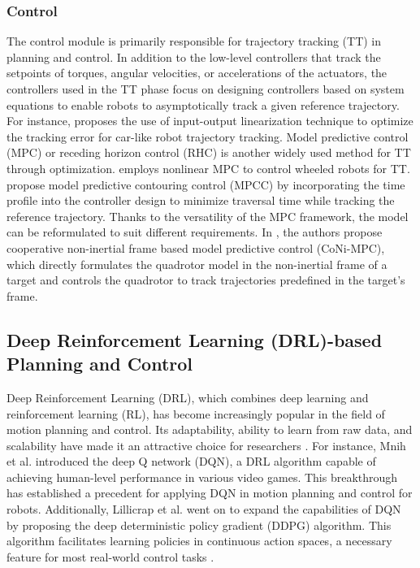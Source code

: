 \subsubsection{Control}
The control module is primarily responsible for trajectory tracking (TT) in planning and control. In addition to the low-level controllers that track the setpoints of torques, angular velocities, or accelerations of the actuators, the controllers used in the TT phase focus on designing controllers based on system equations to enable robots to asymptotically track a given reference trajectory. For instance, \cite{majd2019stable} proposes the use of input-output linearization technique to optimize the tracking error for car-like robot trajectory tracking. Model predictive control (MPC) or receding horizon control (RHC) is another widely used method for TT through optimization. \cite{kunhe2005mobile} employs nonlinear MPC to control wheeled robots for TT. \cite{romero2022model,ji2021cmpcc} propose model predictive contouring control (MPCC) by incorporating the time profile into the controller design to minimize traversal time while tracking the reference trajectory. Thanks to the versatility of the MPC framework, the model can be reformulated to suit different requirements. In \cite{zhang2023coni}, the authors propose cooperative non-inertial frame based model predictive control (CoNi-MPC), which directly formulates the quadrotor model in the non-inertial frame of a target and controls the quadrotor to track trajectories predefined in the target's frame.\subsection{Deep Reinforcement Learning (DRL)-based Planning and Control}
Deep Reinforcement Learning (DRL), which combines deep learning and reinforcement learning (RL), has become increasingly popular in the field of motion planning and control. Its adaptability, ability to learn from raw data, and scalability have made it an attractive choice for researchers \cite{mnih2015human}. For instance, Mnih et al. introduced the deep Q network (DQN), a DRL algorithm capable of achieving human-level performance in various video games. This breakthrough has established a precedent for applying DQN in motion planning and control for robots. Additionally, Lillicrap et al. went on to expand the capabilities of DQN by proposing the deep deterministic policy gradient (DDPG) algorithm. This algorithm facilitates learning policies in continuous action spaces, a necessary feature for most real-world control tasks \cite{lillicrap2015continuous}.

